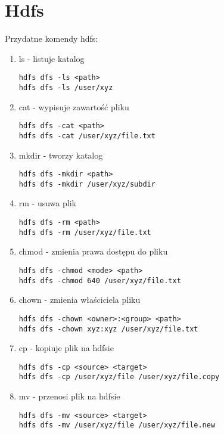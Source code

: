 \documentclass[11pt]{article}
\begin{document}
\section*{Hdfs}

Przydatne komendy hdfs:
\begin{enumerate}
\item ls - listuje katalog
\begin{lstlisting}
hdfs dfs -ls <path>
hdfs dfs -ls /user/xyz
\end{lstlisting}

\item cat - wypisuje zawartość pliku
\begin{lstlisting}
hdfs dfs -cat <path>
hdfs dfs -cat /user/xyz/file.txt
\end{lstlisting}

\item mkdir - tworzy katalog
\begin{lstlisting}
hdfs dfs -mkdir <path>
hdfs dfs -mkdir /user/xyz/subdir
\end{lstlisting}
 
\item rm - usuwa plik
\begin{lstlisting}
hdfs dfs -rm <path>
hdfs dfs -rm /user/xyz/file.txt
\end{lstlisting}

\item chmod - zmienia prawa dostępu do pliku
\begin{lstlisting}
hdfs dfs -chmod <mode> <path>
hdfs dfs -chmod 640 /user/xyz/file.txt
\end{lstlisting}

\item chown - zmienia właściciela pliku
\begin{lstlisting}
hdfs dfs -chown <owner>:<group> <path>
hdfs dfs -chown xyz:xyz /user/xyz/file.txt
\end{lstlisting}

\item cp - kopiuje plik na hdfsie
\begin{lstlisting}
hdfs dfs -cp <source> <target>
hdfs dfs -cp /user/xyz/file /user/xyz/file.copy
\end{lstlisting}

\item mv - przenosi plik na hdfsie
\begin{lstlisting}
hdfs dfs -mv <source> <target>
hdfs dfs -mv /user/xyz/file /user/xyz/file.new
\end{lstlisting}


\end{enumerate}
\end{document}
